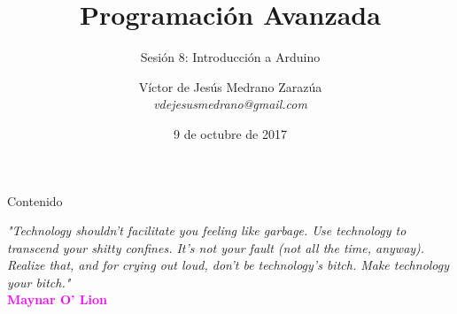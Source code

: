\documentclass{beamer}
\title[Programación Avanzada]{Programación Avanzada}
\subtitle{Sesión 8: Introducción a Arduino}
\author{Víctor de Jesús Medrano Zarazúa \\
	\textit{vdejesusmedrano@gmail.com}\\}
\institute{Universidad del Valle de México}
\date{9 de octubre de 2017}
\begin{document}
	
	\begin{frame}
		\titlepage
	\end{frame}
	
	\begin{frame}[t]{Contenido}\vspace{4pt}
		\tableofcontents
	\end{frame}
	
	\begin{frame}
		\textit{"Technology shouldn't facilitate you feeling like garbage. Use technology to transcend your shitty confines.
			It's not your fault (not all the time, anyway). Realize that, and for crying out loud, don't be technology's bitch. Make technology your bitch."}\\
		\textcolor{magenta}{\textbf{Maynar O' Lion}}
	\end{frame}
	
\end{document}
